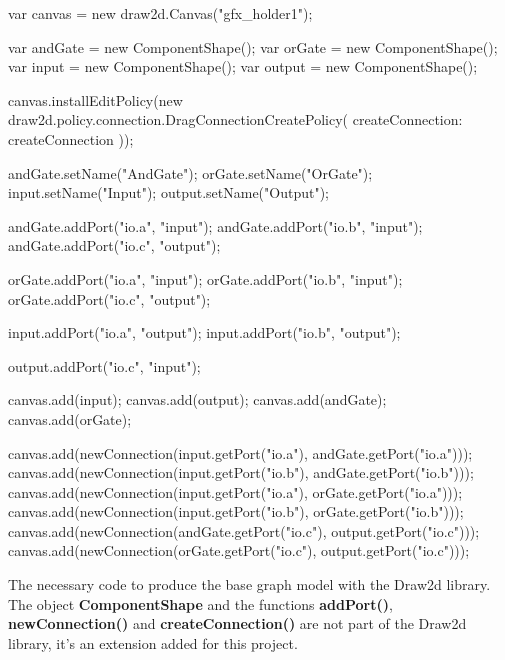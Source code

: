 \begin{listing}[H]
  \centering
  \begin{jscode}
    var canvas = new draw2d.Canvas("gfx_holder1");

    var andGate = new ComponentShape();
    var orGate = new ComponentShape();
    var input = new ComponentShape();
    var output = new ComponentShape();

    canvas.installEditPolicy(new draw2d.policy.connection.DragConnectionCreatePolicy({
      createConnection: createConnection
    }));

    andGate.setName("AndGate");
    orGate.setName("OrGate");
    input.setName("Input");
    output.setName("Output");

    andGate.addPort("io.a", "input");
    andGate.addPort("io.b", "input");
    andGate.addPort("io.c", "output");

    orGate.addPort("io.a", "input");
    orGate.addPort("io.b", "input");
    orGate.addPort("io.c", "output");

    input.addPort("io.a", "output");
    input.addPort("io.b", "output");

    output.addPort("io.c", "input");

    canvas.add(input);
    canvas.add(output);
    canvas.add(andGate);
    canvas.add(orGate);

    canvas.add(newConnection(input.getPort("io.a"), andGate.getPort("io.a")));
    canvas.add(newConnection(input.getPort("io.b"), andGate.getPort("io.b")));
    canvas.add(newConnection(input.getPort("io.a"), orGate.getPort("io.a")));
    canvas.add(newConnection(input.getPort("io.b"), orGate.getPort("io.b")));
    canvas.add(newConnection(andGate.getPort("io.c"), output.getPort("io.c")));
    canvas.add(newConnection(orGate.getPort("io.c"), output.getPort("io.c")));
  \end{jscode}

  \caption[Base graph model implementation using the Draw2D library]{The necessary code to produce the base graph model with the Draw2d library.
    The object \textbf{ComponentShape} and the functions \textbf{addPort()},
    \textbf{newConnection()} and \textbf{createConnection()} are not part of the
    Draw2d library, it's an extension added for this project.}
  \label{lst:draw2d-base-graph-model}
\end{listing}


